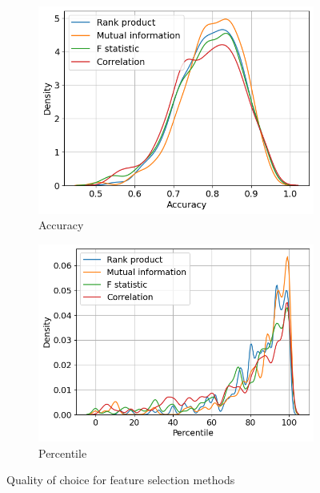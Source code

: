 \begin{figure}[h]
    \centering
    \begin{subfigure}[b]{0.48\textwidth}
        \includegraphics[width=\textwidth]{assets/results/feature-combinations/fsel-accuracy.png}
        \caption{Accuracy}
    \end{subfigure}
    \hfill
    \begin{subfigure}[b]{0.48\textwidth}
        \includegraphics[width=\textwidth]{assets/results/feature-combinations/fsel-percentile.png}
        \caption{Percentile}
    \end{subfigure}
    \caption{Quality of choice for feature selection methods}
    \label{fig:evaluation:kde-fsel-perecentile}
\end{figure}

